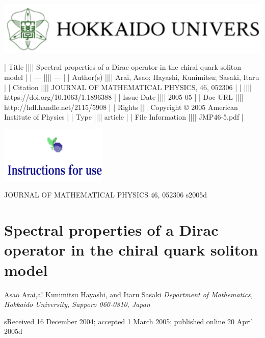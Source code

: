 \documentclass{article}
\begin{document}
\includegraphics{_page_0_Picture_0.png}


| Title            |||| Spectral properties of a Dirac operator in the chiral quark soliton model |
| ---              |||| ---                                                                       |
| Author(s)        |||| Arai, Asao; Hayashi, Kunimitsu; Sasaki, Itaru                             |
| Citation         |||| JOURNAL OF MATHEMATICAL PHYSICS, 46, 052306                               |
|                  |||| https://doi.org/10.1063/1.1896388                                         |
| Issue Date       |||| 2005-05                                                                   |
| Doc URL          |||| http://hdl.handle.net/2115/5908                                           |
| Rights           |||| Copyright © 2005 American Institute of Physics                            |
| Type             |||| article                                                                   |
| File Information |||| JMP46-5.pdf                                                               |


\includegraphics{_page_0_Picture_2.png}


JOURNAL OF MATHEMATICAL PHYSICS 46, 052306 s2005d

\section{\textbf{Spectral properties of a Dirac operator in the chiral quark soliton model}}

Asao Arai,a! Kunimitsu Hayashi, and Itaru Sasaki \textit{Department of Mathematics, Hokkaido University, Sapporo 060-0810, Japan}

sReceived 16 December 2004; accepted 1 March 2005; published online 20 April 2005d
\end{document}
